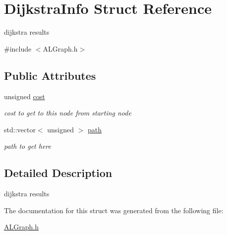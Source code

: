 \hypertarget{structDijkstraInfo}{\section{Dijkstra\-Info Struct Reference}
\label{structDijkstraInfo}
}


dijkstra results  




{\ttfamily \#include $<$A\-L\-Graph.\-h$>$}

\subsection*{Public Attributes}
\begin{DoxyCompactItemize}
\item 
\hypertarget{structDijkstraInfo_a5910662db0401c504e30ec070fb6a7ed}{unsigned \hyperlink{structDijkstraInfo_a5910662db0401c504e30ec070fb6a7ed}{cost}}\label{structDijkstraInfo_a5910662db0401c504e30ec070fb6a7ed}

\begin{DoxyCompactList}\small\item\em cost to get to this node from starting node \end{DoxyCompactList}\item 
\hypertarget{structDijkstraInfo_ae83cc89ee42597b8b8cb0d2952515106}{std\-::vector$<$ unsigned $>$ \hyperlink{structDijkstraInfo_ae83cc89ee42597b8b8cb0d2952515106}{path}}\label{structDijkstraInfo_ae83cc89ee42597b8b8cb0d2952515106}

\begin{DoxyCompactList}\small\item\em path to get here \end{DoxyCompactList}\end{DoxyCompactItemize}


\subsection{Detailed Description}
dijkstra results 

The documentation for this struct was generated from the following file\-:\begin{DoxyCompactItemize}
\item 
\hyperlink{ALGraph_8h}{A\-L\-Graph.\-h}\end{DoxyCompactItemize}
